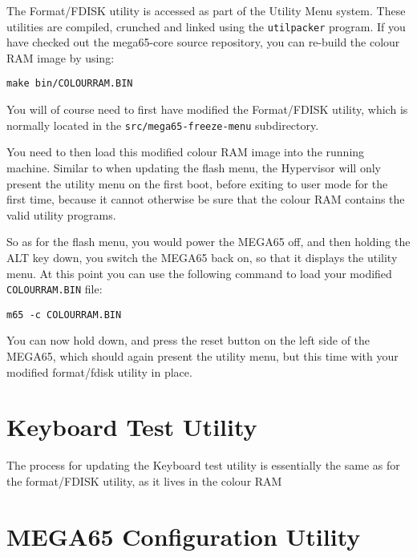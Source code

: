 The Format/FDISK utility is accessed as part of the Utility Menu system.  These utilities are compiled, crunched and linked using the
{\tt utilpacker} program.  If you have checked out the mega65-core source repository, you can re-build the colour RAM image by using:

\begin{tcolorbox}[colback=black,coltext=white]
\verbatimfont{\codefont}
\begin{verbatim}
make bin/COLOURRAM.BIN
\end{verbatim}
\end{tcolorbox}

You will of course need to first have modified the Format/FDISK utility, which is normally located in the {\tt src/mega65-freeze-menu} subdirectory.

You need to then load this modified colour RAM image into the running machine. Similar to when updating the flash menu, the Hypervisor will
only present the utility menu on the first boot, before exiting to user mode for the first time, because it cannot otherwise be sure that
the colour RAM contains the valid utility programs.  

So as for the flash menu, you would power the MEGA65 off, and then holding the ALT key down, you switch the MEGA65 back on, so that it displays the utility menu.  At this point you can use the following command to load your modified {\tt COLOURRAM.BIN} file:

\begin{tcolorbox}[colback=black,coltext=white]
\verbatimfont{\codefont}
\begin{verbatim}
m65 -c COLOURRAM.BIN
\end{verbatim}
\end{tcolorbox}

You can now hold  down, and press the reset button on the left side of the MEGA65, which should
again present
the utility menu,
but this time with your modified format/fdisk utility in place.

\section{Keyboard Test Utility}

The process for updating the Keyboard test utility is essentially the same as for the format/FDISK utility, as it lives in the colour RAM

\section{MEGA65 Configuration Utility}

